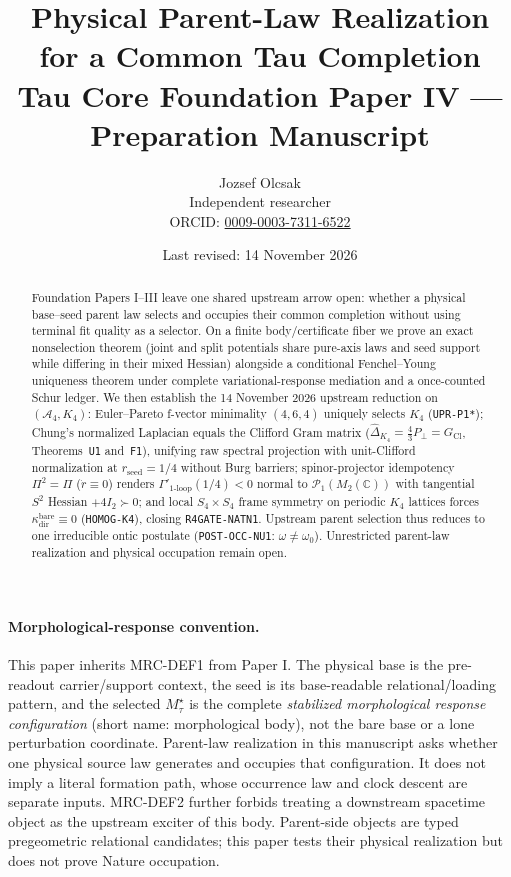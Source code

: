 \documentclass[11pt]{article}
\title{\textbf{Physical Parent-Law Realization for a Common Tau Completion}\\
\large Tau Core Foundation Paper IV --- Preparation Manuscript}
\author{Jozsef Olcsak\\\small Independent researcher\\{\small ORCID: \href{https://orcid.org/0009-0003-7311-6522}{0009-0003-7311-6522}}}
\date{Last revised: 14 November 2026}
\begin{document}
\maketitle

\begin{abstract}
Foundation Papers I--III leave one shared upstream arrow open: whether a physical base--seed parent law selects and occupies their common completion without using terminal fit quality as a selector. On a finite body/certificate fiber we prove an exact nonselection theorem (joint and split potentials share pure-axis laws and seed support while differing in their mixed Hessian) alongside a conditional Fenchel--Young uniqueness theorem under complete variational-response mediation and a once-counted Schur ledger. We then establish the 14 November 2026 upstream reduction on $(\mathcal{A}_4,K_4)$: Euler--Pareto f-vector minimality $(4,6,4)$ uniquely selects $K_4$ (\texttt{UPR-P1*}); Chung's normalized Laplacian equals the Clifford Gram matrix ($\widehat{\Delta}_{K_4}=\frac{4}{3}P_\perp=G_{\mathrm{Cl}}$, Theorems~\texttt{U1} and~\texttt{F1}), unifying raw spectral projection with unit-Clifford normalization at $r_{\mathrm{seed}}=1/4$ without Burg barriers; spinor-projector idempotency $\Pi^2=\Pi$ ($\dot{r}\equiv 0$) renders $\Gamma'_{1\text{-loop}}(1/4)<0$ normal to $\mathcal{P}_1(M_2(\mathbb{C}))$ with tangential $S^2$ Hessian $+4I_2\succ 0$; and local $S_4\times S_4$ frame symmetry on periodic $K_4$ lattices forces $\kappa_{\mathrm{dir}}^{\mathrm{bare}}\equiv 0$ (\texttt{HOMOG-K4}), closing \texttt{R4GATE-NATN1}. Upstream parent selection thus reduces to one irreducible ontic postulate (\texttt{POST-OCC-NU1}: $\omega\neq\omega_0$). Unrestricted parent-law realization and physical occupation remain open.
\end{abstract}

\paragraph{Morphological-response convention.}
This paper inherits MRC-DEF1 from Paper I.  The physical base is the
pre-readout carrier/support context, the seed is its base-readable
relational/loading pattern, and the selected $M_\tau^\star$ is the complete
\emph{stabilized morphological response configuration} (short name:
morphological body), not the bare base or a lone perturbation coordinate.
Parent-law realization in this manuscript asks whether one physical source
law generates and occupies that configuration.  It does not imply a literal
formation path, whose occurrence law and clock descent are separate inputs.
MRC-DEF2 further forbids treating a downstream spacetime object as the
upstream exciter of this body. Parent-side objects are typed pregeometric
relational candidates; this paper tests their physical realization but does
not prove Nature occupation.
\end{document}
